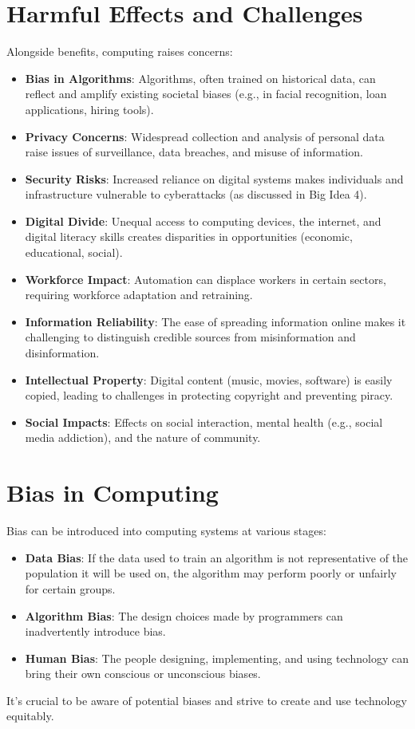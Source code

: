 \documentclass[11pt,oneside]{book}
\begin{document}
\section{Harmful Effects and Challenges}
\label{sec:harmful_effects}
Alongside benefits, computing raises concerns:
\begin{itemize}
    \item \textbf{Bias in Algorithms}: Algorithms, often trained on historical data, can reflect and amplify existing societal biases (e.g., in facial recognition, loan applications, hiring tools).
    \item \textbf{Privacy Concerns}: Widespread collection and analysis of personal data raise issues of surveillance, data breaches, and misuse of information.
    \item \textbf{Security Risks}: Increased reliance on digital systems makes individuals and infrastructure vulnerable to cyberattacks (as discussed in Big Idea 4).
    \item \textbf{Digital Divide}: Unequal access to computing devices, the internet, and digital literacy skills creates disparities in opportunities (economic, educational, social).
    \item \textbf{Workforce Impact}: Automation can displace workers in certain sectors, requiring workforce adaptation and retraining.
    \item \textbf{Information Reliability}: The ease of spreading information online makes it challenging to distinguish credible sources from misinformation and disinformation.
    \item \textbf{Intellectual Property}: Digital content (music, movies, software) is easily copied, leading to challenges in protecting copyright and preventing piracy.
    \item \textbf{Social Impacts}: Effects on social interaction, mental health (e.g., social media addiction), and the nature of community.
\end{itemize}

\section{Bias in Computing}
\label{sec:bias_computing}
Bias can be introduced into computing systems at various stages:
\begin{itemize}
    \item \textbf{Data Bias}: If the data used to train an algorithm is not representative of the population it will be used on, the algorithm may perform poorly or unfairly for certain groups.
    \item \textbf{Algorithm Bias}: The design choices made by programmers can inadvertently introduce bias.
    \item \textbf{Human Bias}: The people designing, implementing, and using technology can bring their own conscious or unconscious biases.
\end{itemize}
It's crucial to be aware of potential biases and strive to create and use technology equitably.
\end{document}
